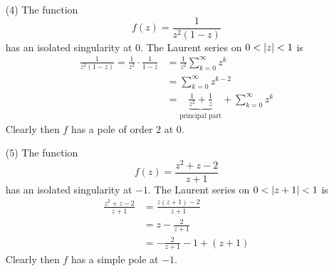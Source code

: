 \begin{example}
\begin{itemize}[itemsep=1em]
\item[(4)] The function
\[f(z) = \frac{1}{z^2(1 - z)}\]
has an isolated singularity at $0$. The Laurent series on $0 < \left\lvert z\right\rvert < 1$ is
\begin{align*}
\frac{1}{z^2(1 - z)} = \frac{1}{z^2}\cdot \frac{1}{1 - z} &= \frac{1}{z^2}\sum_{k=0}^\infty z^k\\[0.5em]
 &= \sum_{k=0}^\infty z^{k-2}\\[0.5em]
 &= \underbrace{\frac{1}{z^2} + \frac{1}{z}}_{\text{principal part}} + \sum_{k=0}^\infty z^k
\end{align*}
Clearly then $f$ has a pole of order $2$ at $0$.

\item[(5)] The function
\[f(z) = \frac{z^2 + z - 2}{z + 1}\]
has an isolated singularity at $-1$. The Laurent series on $0 < \left\lvert z + 1\right\rvert < 1$ is
\begin{align*}
\frac{z^2 + z - 2}{z + 1} &= \frac{z(z + 1) - 2}{z + 1}\\[0.5em]
 &= z - \frac{2}{z + 1}\\[0.5em]
 &= -\frac{2}{z + 1} - 1 + (z + 1)
\end{align*}
Clearly then $f$ has a simple pole at $-1$.
\end{itemize}
\end{example}

\vspace*{2em}

